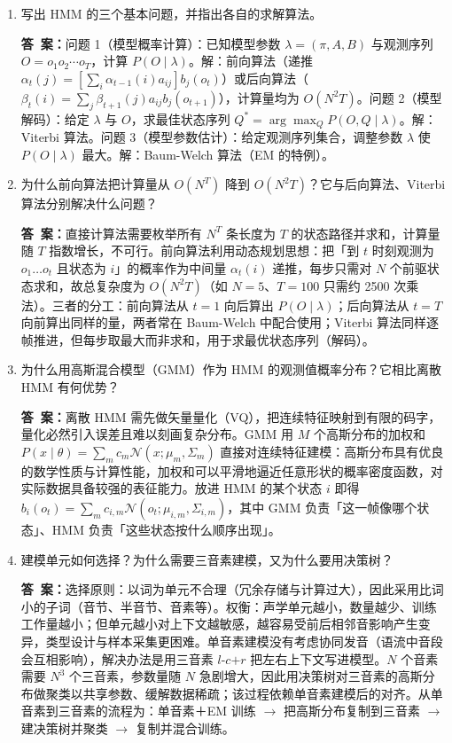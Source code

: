 \documentclass[10.5pt]{ctexart}
\newenvironment{qlist}
  {\begin{enumerate}[label={\sffamily\bfseries\color{accent}\arabic*.},leftmargin=2.4em,labelsep=0.55em,itemsep=0.62em,topsep=0.15em,parsep=0.3em,partopsep=0pt]}
  {\end{enumerate}}
\newcommand{\anslabel}{{\sffamily\bfseries\color{accent}答\ 案：}\hspace{0.35em}}
\newcommand{\ansL}[1]{\par\vspace{3.6\baselineskip}\begin{ansbox}\anslabel #1\end{ansbox}}
\begin{document}
\begin{qlist}

\item 写出 HMM 的三个基本问题，并指出各自的求解算法。
\ansL{问题 1（模型概率计算）：已知模型参数 $\lambda=(\pi,A,B)$ 与观测序列 $O=o_1o_2\cdots o_T$，计算 $P(O\mid\lambda)$。解：前向算法（递推 $\alpha_t(j)=[\sum_i\alpha_{t-1}(i)a_{ij}]b_j(o_t)$）或后向算法（$\beta_t(i)=\sum_j\beta_{t+1}(j)a_{ij}b_j(o_{t+1})$），计算量均为 $O(N^2T)$。问题 2（模型解码）：给定 $\lambda$ 与 $O$，求最佳状态序列 $Q^*=\arg\max_Q P(O,Q\mid\lambda)$。解：Viterbi 算法。问题 3（模型参数估计）：给定观测序列集合，调整参数 $\lambda$ 使 $P(O\mid\lambda)$ 最大。解：Baum-Welch 算法（EM 的特例）。}

\item 为什么前向算法把计算量从 $O(N^T)$ 降到 $O(N^2T)$？它与后向算法、Viterbi 算法分别解决什么问题？
\ansL{直接计算法需要枚举所有 $N^T$ 条长度为 $T$ 的状态路径并求和，计算量随 $T$ 指数增长，不可行。前向算法利用动态规划思想：把「到 $t$ 时刻观测为 $o_1\dots o_t$ 且状态为 $i$」的概率作为中间量 $\alpha_t(i)$ 递推，每步只需对 $N$ 个前驱状态求和，故总复杂度为 $O(N^2T)$（如 $N=5$、$T=100$ 只需约 2500 次乘法）。三者的分工：前向算法从 $t=1$ 向后算出 $P(O\mid\lambda)$；后向算法从 $t=T$ 向前算出同样的量，两者常在 Baum-Welch 中配合使用；Viterbi 算法同样逐帧推进，但每步取最大而非求和，用于求最优状态序列（解码）。}

\item 为什么用高斯混合模型（GMM）作为 HMM 的观测值概率分布？它相比离散 HMM 有何优势？
\ansL{离散 HMM 需先做矢量量化（VQ），把连续特征映射到有限的码字，量化必然引入误差且难以刻画复杂分布。GMM 用 $M$ 个高斯分布的加权和 $P(x\mid\theta)=\sum_m c_m\mathcal N(x;\mu_m,\Sigma_m)$ 直接对连续特征建模：高斯分布具有优良的数学性质与计算性能，加权和可以平滑地逼近任意形状的概率密度函数，对实际数据具备较强的表征能力。放进 HMM 的某个状态 $i$ 即得 $b_i(o_t)=\sum_m c_{i,m}\mathcal N(o_t;\mu_{i,m},\Sigma_{i,m})$，其中 GMM 负责「这一帧像哪个状态」、HMM 负责「这些状态按什么顺序出现」。}

\item 建模单元如何选择？为什么需要三音素建模，又为什么要用决策树？
\ansL{选择原则：以词为单元不合理（冗余存储与计算过大），因此采用比词小的子词（音节、半音节、音素等）。权衡：声学单元越小，数量越少、训练工作量越小；但单元越小对上下文越敏感，越容易受前后相邻音影响产生变异，类型设计与样本采集更困难。单音素建模没有考虑协同发音（语流中音段会互相影响），解决办法是用三音素 $l\text{-}c\text{+}r$ 把左右上下文写进模型。$N$ 个音素需要 $N^3$ 个三音素，参数量随 $N$ 急剧增大，因此用决策树对三音素的高斯分布做聚类以共享参数、缓解数据稀疏；该过程依赖单音素建模后的对齐。从单音素到三音素的流程为：单音素＋EM 训练 $\to$ 把高斯分布复制到三音素 $\to$ 建决策树并聚类 $\to$ 复制并混合训练。}


\end{qlist}
\end{document}
